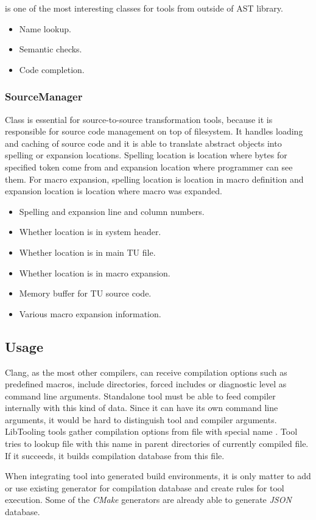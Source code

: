  is one of the most interesting classes for tools from outside of AST library.

\begin{itemize}
\item Name lookup.
\item Semantic checks.
\item Code completion.
\end{itemize}

\subsubsection{SourceManager}
Class is essential for source-to-source transformation tools, because it is responsible for source code management on top of filesystem. It handles loading and caching of source code and it is able to translate abstract  objects into spelling or expansion locations. Spelling location is location where bytes for specified token come from and expansion location where programmer can see them. For macro expansion, spelling location is location in macro definition and expansion location is location where macro was expanded.

\begin{itemize}
\item Spelling and expansion line and column numbers.
\item Whether location is in system header.
\item Whether location is in main TU file.
\item Whether location is in macro expansion.
\item Memory buffer for TU source code.
\item Various macro expansion information.
\end{itemize}

\subsection{Usage}
Clang, as the most other compilers, can receive compilation options such as predefined macros, include directories, forced includes or diagnostic level as command line arguments. Standalone tool must be able to feed compiler internally with this kind of data. Since it can have its own command line arguments, it would be hard to distinguish tool and compiler arguments. LibTooling tools gather compilation options from file with special name . Tool tries to lookup file with this name in parent directories of currently compiled file. If it succeeds, it builds compilation database from this file.

When integrating tool into generated build environments, it is only matter to add or use existing generator for compilation database and create rules for tool execution. Some of the \emph{CMake} generators are already able to generate \emph{JSON} database.